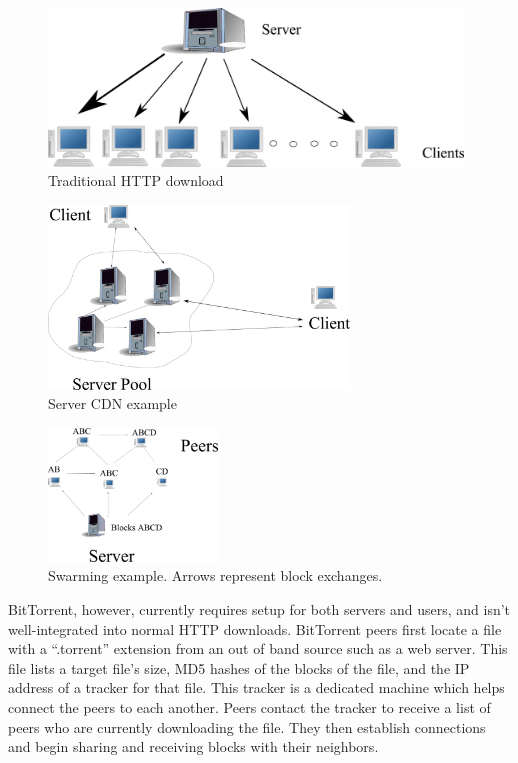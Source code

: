 \begin{figure}
\begin{center}
   \includegraphics[width=11cm]{description_pics/traditional_http.png}
    \caption{Traditional HTTP download}
 \label{fig:traditional_http}
 \end{center}
\end{figure}
\begin{figure}
    \centering
  \includegraphics[width=8cm]{description_pics/server_side_only.png}
  \caption{Server CDN example}
  \label{fig:server_only}
\end{figure}   
\begin{figure}
 \centering
 \includegraphics[width=4.5cm]{description_pics/normal_swarm.png}
 \caption{Swarming example.  Arrows represent block exchanges.}
 \label{fig:normal_swarm}
\end{figure}

BitTorrent, however, currently requires setup for both servers and users, and isn't well-integrated into normal HTTP downloads.  BitTorrent peers first locate a 
file with a ``.torrent'' extension from an out of band source such as a web server.  This file lists a target file's size, MD5 hashes of the blocks of the file, and 
the IP address of a tracker for that file.  This tracker is a dedicated machine which helps connect the peers to each another.  Peers contact the tracker to receive 
a list of peers who are currently downloading the file.  They then establish connections and begin sharing and receiving blocks with their neighbors.


